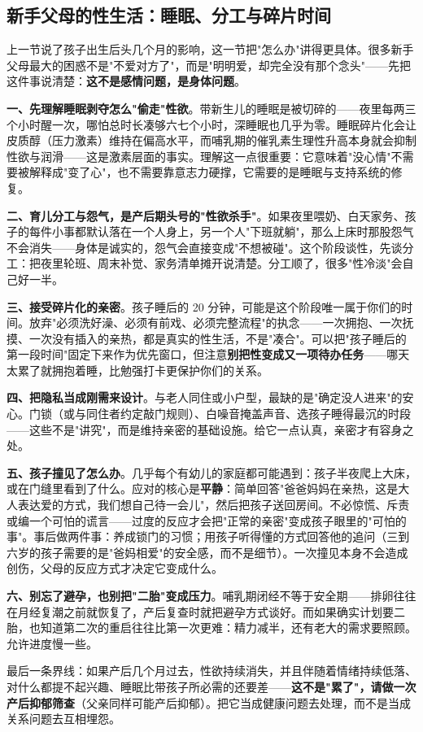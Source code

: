 \subsection{新手父母的性生活：睡眠、分工与碎片时间}

上一节说了孩子出生后头几个月的影响，这一节把"怎么办"讲得更具体。很多新手父母最大的困惑不是"不爱对方了"，而是"明明爱，却完全没有那个念头"——先把这件事说清楚：\textbf{这不是感情问题，是身体问题}。

\textbf{一、先理解睡眠剥夺怎么"偷走"性欲}。带新生儿的睡眠是被切碎的——夜里每两三个小时醒一次，哪怕总时长凑够六七个小时，深睡眠也几乎为零。睡眠碎片化会让皮质醇（压力激素）维持在偏高水平，而哺乳期的催乳素生理性升高本身就会抑制性欲与润滑——这是激素层面的事实。理解这一点很重要：它意味着"没心情"不需要被解释成"变了心"，也不需要靠意志力硬撑，它需要的是睡眠与支持系统的修复。

\textbf{二、育儿分工与怨气，是产后期头号的"性欲杀手"}。如果夜里喂奶、白天家务、孩子的每件小事都默认落在一个人身上，另一个人"下班就躺"，那么上床时那股怨气不会消失——身体是诚实的，怨气会直接变成"不想被碰"。这个阶段谈性，先谈分工：把夜里轮班、周末补觉、家务清单摊开说清楚。分工顺了，很多"性冷淡"会自己好一半。

\textbf{三、接受碎片化的亲密}。孩子睡后的 20 分钟，可能是这个阶段唯一属于你们的时间。放弃"必须洗好澡、必须有前戏、必须完整流程"的执念——一次拥抱、一次抚摸、一次没有插入的亲热，都是真实的性生活，不是"凑合"。可以把"孩子睡后的第一段时间"固定下来作为优先窗口，但注意\textbf{别把性变成又一项待办任务}——哪天太累了就拥抱着睡，比勉强打卡更保护你们的关系。

\textbf{四、把隐私当成刚需来设计}。与老人同住或小户型，最缺的是"确定没人进来"的安心。门锁（或与同住者约定敲门规则）、白噪音掩盖声音、选孩子睡得最沉的时段——这些不是"讲究"，而是维持亲密的基础设施。给它一点认真，亲密才有容身之处。

\textbf{五、孩子撞见了怎么办}。几乎每个有幼儿的家庭都可能遇到：孩子半夜爬上大床，或在门缝里看到了什么。应对的核心是\textbf{平静}：简单回答"爸爸妈妈在亲热，这是大人表达爱的方式，我们想自己待一会儿"，然后把孩子送回房间。不必惊慌、斥责或编一个可怕的谎言——过度的反应才会把"正常的亲密"变成孩子眼里的"可怕的事"。事后做两件事：养成锁门的习惯；用孩子听得懂的方式回答他的追问（三到六岁的孩子需要的是"爸妈相爱"的安全感，而不是细节）。一次撞见本身不会造成创伤，父母的反应方式才决定它变成什么。

\textbf{六、别忘了避孕，也别把"二胎"变成压力}。哺乳期闭经不等于安全期——排卵往往在月经复潮之前就恢复了，产后复查时就把避孕方式谈好。而如果确实计划要二胎，也知道第二次的重启往往比第一次更难：精力减半，还有老大的需求要照顾。允许进度慢一些。

最后一条界线：如果产后几个月过去，性欲持续消失，并且伴随着情绪持续低落、对什么都提不起兴趣、睡眠比带孩子所必需的还要差——\textbf{这不是"累了"，请做一次产后抑郁筛查}（父亲同样可能产后抑郁）。把它当成健康问题去处理，而不是当成关系问题去互相埋怨。
